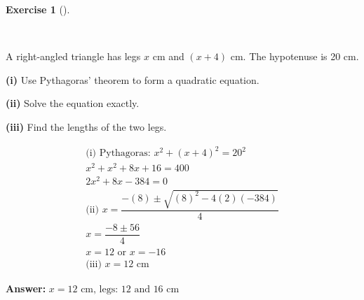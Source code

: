\documentclass[
  letterpaper,
  DIV=11,
  numbers=noendperiod]{scrreprt}
\theoremstyle{definition}
\newtheorem{exercise}{Exercise}[chapter]
\theoremstyle{remark}
\begin{document}
\begin{exercise}[]\protect\hypertarget{exr-u6-22-2}{}\label{exr-u6-22-2}

~

A right-angled triangle has legs \(x\) cm and \((x + 4)\) cm. The
hypotenuse is 20 cm.

\textbf{(i)} Use Pythagoras' theorem to form a quadratic equation.

\textbf{(ii)} Solve the equation exactly.

\textbf{(iii)} Find the lengths of the two legs.

\begin{tcolorbox}[enhanced jigsaw, opacitybacktitle=0.6, coltitle=black, arc=.35mm, colframe=quarto-callout-tip-color-frame, colback=white, bottomrule=.15mm, left=2mm, colbacktitle=quarto-callout-tip-color!10!white, titlerule=0mm, opacityback=0, title=\textcolor{quarto-callout-tip-color}{\faLightbulb}\hspace{0.5em}{🔍 View Solution}, leftrule=.75mm, breakable, rightrule=.15mm, bottomtitle=1mm, toptitle=1mm, toprule=.15mm]

\begin{align*}
\text{(i) Pythagoras: } x^2 + (x+4)^2 = 20^2 \\ x^2 + x^2 + 8x + 16 = 400 \\ 2x^2 + 8x - 384 = 0 \\ \text{(ii) } x = \dfrac{-(8) \pm \sqrt{(8)^2 - 4(2)(-384)}}{4} \\ x = \dfrac{-8 \pm 56}{4} \\ x = 12 \text{ or } x = -16 \\ \text{(iii) } x = 12 \text{ cm}
\end{align*}

\textbf{Answer:}
\(x = 12 \text{ cm, legs: } 12 \text{ and } 16 \text{ cm}\)

\end{tcolorbox}

\end{exercise}
\end{document}
